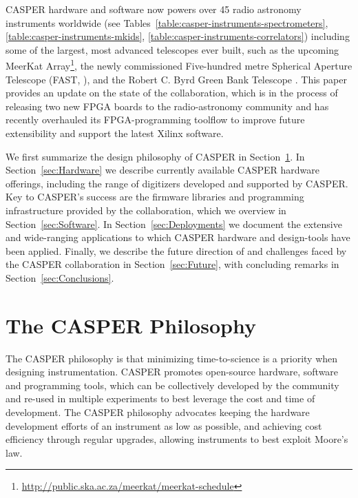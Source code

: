 \documentclass{ws-jai}
\begin{document}
CASPER hardware and software now powers over 45 radio astronomy
instruments worldwide (see Tables~\ref{table:casper-instruments-spectrometers},
\ref{table:casper-instruments-mkids},
\ref{table:casper-instruments-correlators}) including some of the largest, most
advanced telescopes ever built, such as the upcoming MeerKat
Array\footnote{\url{http://public.ska.ac.za/meerkat/meerkat-schedule}}, the
newly commissioned Five-hundred metre Spherical Aperture Telescope (FAST,
\citet{fast}), and the Robert C. Byrd Green Bank Telescope \citep{vegas}. This paper
provides an update on the state of the collaboration, which is in the process of releasing
two new FPGA boards to the radio-astronomy community and has recently overhauled
its FPGA-programming toolflow to improve future extensibility and support the latest Xilinx software.

We first summarize the design philosophy of CASPER in
Section~\ref{sec:CASPER-philosophy}.  In Section~\ref{sec:Hardware} we describe
currently available CASPER hardware offerings, including the range of
digitizers developed and supported by CASPER. Key to CASPER's success are the
firmware libraries and programming infrastructure provided by the
collaboration, which we overview in Section~\ref{sec:Software}.  In
Section~\ref{sec:Deployments} we document the extensive and wide-ranging
applications to which CASPER hardware and design-tools have been applied.
Finally, we describe the future direction of and challenges faced by the CASPER
collaboration in Section~\ref{sec:Future}, with concluding remarks in
Section~\ref{sec:Conclusions}.

\section{The CASPER Philosophy} \label{sec:CASPER-philosophy}

The CASPER philosophy is that minimizing time-to-science is a priority when designing instrumentation. CASPER promotes open-source hardware, software and programming tools, which can be collectively developed by the community and re-used in multiple experiments to best leverage the cost and time of development.
The CASPER philosophy advocates keeping the hardware development efforts of an instrument as low as possible, and achieving cost efficiency through regular upgrades, allowing instruments to best exploit Moore's law.
\end{document}
